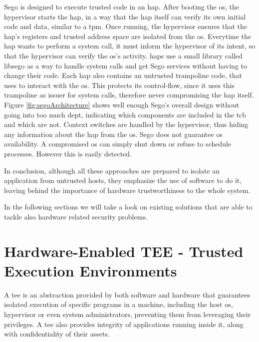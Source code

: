 Sego is designed to execute trusted code in an \gls{hap}.
After booting the \gls{os}, the hypervisor starts the \gls{hap}, in a way that the \gls{hap} itself can verify its own initial code and data, similar to a \gls{tpm}.
Once running, the hypervisor ensures that the \gls{hap}’s registers and trusted address space are isolated from the \gls{os}. Everytime the \gls{hap} wants to perform a system call, it must inform
the hypervisor of its intent, so that the hypervisor can verify the \gls{os}'s activity. \gls{hap}s use a
small library called libsego as a way to handle system calls and get Sego services without having to change their code. Each \gls{hap} also contains an untrusted trampoline code, that
uses to interact with the \gls{os}. This protects its control-flow, since it uses this trampoline as issuer for system calls, therefore never compromising the \gls{hap} itself. Figure \ref{fig:segoArchitecture} shows well enough Sego’s overall design without going into too much dept, indicating which components are included in the \gls{tcb} and which are not.
Context switches are handled by the hypervisor, thus hiding any information about the \gls{hap} from the \gls{os}.
Sego does not guarantee \gls{os} availability. A compromised \gls{os} can simply shut down or refuse to schedule processes. However this is easily detected.\newline


In conclusion, although all these approaches are prepared to isolate an application from untrusted hosts, they emphasize the use of software to do it, leaving behind the importance of hardware trustworthiness to the whole system.

In the following sections we will take a look on existing solutions that are able to tackle also hardware related security problems.

\section{Hardware-Enabled TEE - Trusted Execution Environments}
\label{sec:tpm_hsm_tees}

A \gls{tee} is an abstraction provided by both software and hardware that guarantees isolated execution of specific programs in a machine, including the host \gls{os}, hypervisor or even system administrators, preventing them from leveraging their privileges. A \gls{tee} also provides integrity of applications running inside it, along with confidentiality of their assets.

